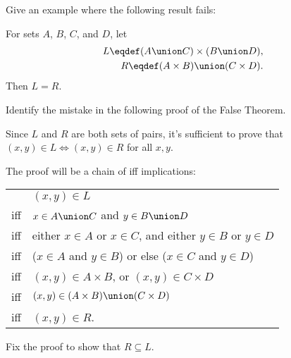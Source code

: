 \begin{problem} %

\bparts
\ppart Give an example where the following result fails:

\begin{falsethm*}
For sets $A$, $B$, $C$, and $D$, let
\begin{align*}
L \eqdef (A \union C) \times (B \union D),\\
R \eqdef (A \times B) \union (C \times D).
\end{align*}
Then $L=R$.
\end{falsethm*}


\ppart Identify the mistake in the following proof of the False Theorem.

\begin{bogusproof}
Since $L$ and $R$ are both sets of pairs, it's sufficient to prove that
$(x,y) \in L \iff (x,y) \in R$ for all $x,y$.

The proof will be a chain of iff implications:
\begin{center}
\begin{tabular}{ll}
    & $(x, y) \in L$  \\
iff & $x \in A \union C$ and $y \in B \union D$ \\
iff & either $x \in A$ or $x \in C$, and either $y \in B$ or $y \in D$ \\
iff & ($x \in A$ and $y \in B$) or else ($x \in C$ and $y \in D$)  \\
iff & $(x,y) \in A \times B$, or $(x,y) \in C \times D$ \\
iff & $(x,y) \in (A \times B) \union (C \times D) $ \\
iff & $(x,y)\in R$.
\end{tabular}
\end{center}

\end{bogusproof}


\ppart Fix the proof to show that $R \subseteq L$.


\eparts

\end{problem}
